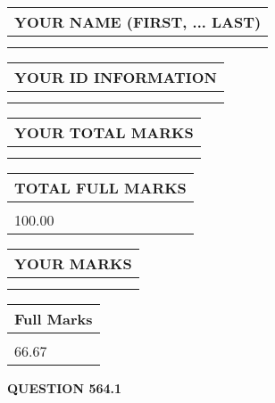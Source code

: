 \documentclass{ctexart}
\begin{document}
   
   
   
\newpage 
\setcounter{page}{ 
   564001 } 
   
   
   
   
\noindent\begin{tabular}{|l|}
\hline
YOUR NAME (FIRST, ... LAST)  \\
\hline
 \\ 
 \\ 
\hline
\end{tabular}
\hspace{0.05in} \begin{tabular}{|l|}
\hline
 YOUR   ID   INFORMATION  \\
\hline
 \\ 
 \\ 
\hline
\end{tabular}
   
   
\vspace{0.2in}\noindent\begin{tabular}{|l|}
\hline
YOUR TOTAL MARKS  \\
\hline
 \\ 
 \\ 
\hline
\end{tabular}
\hspace{0.05in} \begin{tabular}{|l|}
\hline
TOTAL FULL MARKS  \\
\hline
 \\ 
100.00 \\
\hline
\end{tabular}
   
   
 \vspace{0.2in}
 
 
 
 
   
   
  
\vspace{0.2in}
  
\noindent\begin{tabular}{|l|}
\hline
 YOUR MARKS  \\
\hline
 \\ 
 \\ 
\hline
\end{tabular}
\hspace{0.05in} \begin{tabular}{|l|}
\hline
 Full Marks  \\
\hline
 \\ 
66.67 \\
\hline
\end{tabular}
{\textbf{\Large{QUESTION
564.1 
}}}
  
\end{document}
